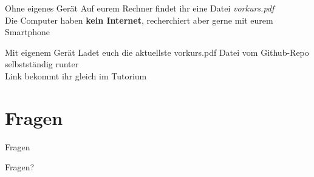 \documentclass[t,aspectratio=1610, 12pt]{beamer} %
\begin{document}
\begin{frame}{Ohne eigenes Gerät}
	Auf eurem Rechner findet ihr eine Datei \emph{vorkurs.pdf} \\
	Die Computer haben \textbf{kein Internet}, recherchiert aber gerne mit eurem Smartphone \\
\end{frame}

\begin{frame}{Mit eigenem Gerät}
	Ladet euch die aktuellste vorkurs.pdf Datei vom Github-Repo selbstständig runter \\
	Link bekommt ihr gleich im Tutorium \\
\end{frame}


\section{Fragen}
\begin{frame}{Fragen}
    \vfill
    \begin{center}
        \Huge Fragen?
    \end{center}
    \vfill
\end{frame}
\end{document}
